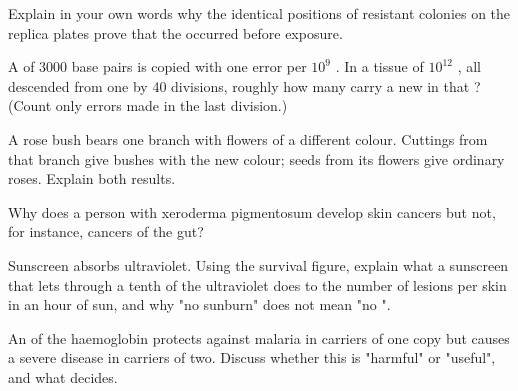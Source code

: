\begin{exercise}[$\star\star$]\label{exo:g11:mutations:8}
Explain in your own words why the identical positions of resistant
colonies on the replica plates prove that the  occurred
before exposure.
\end{exercise}

\begin{exercise}[$\star\star$]\label{exo:g11:mutations:9}
A  of \num{3000} base pairs is copied with one error per $10^9$
. In a tissue of $10^{12}$ , all descended from one
 by 40 divisions, roughly how many  carry a new  in
that ? (Count only errors made in the last division.)
\end{exercise}

\begin{exercise}[$\star\star$]\label{exo:g11:mutations:10}
A rose bush bears one branch with flowers of a different colour.
Cuttings from that branch give bushes with the new colour; seeds from
its flowers give ordinary roses. Explain both results.
\end{exercise}

\begin{exercise}[$\star\star$]\label{exo:g11:mutations:11}
Why does a person with xeroderma pigmentosum develop skin cancers but
not, for instance, cancers of the gut?
\end{exercise}

\begin{exercise}[$\star\star\star$]\label{exo:g11:mutations:12}
Sunscreen absorbs ultraviolet. Using the survival figure, explain what
a sunscreen that lets through a tenth of the ultraviolet does to the
number of lesions per skin  in an hour of sun, and why "no
sunburn" does not mean "no ".
\end{exercise}

\begin{exercise}[$\star\star\star$]\label{exo:g11:mutations:13}
An  of the haemoglobin  protects against malaria in carriers
of one copy but causes a severe disease in carriers of two. Discuss
whether this  is "harmful" or "useful", and what decides.
\end{exercise}

